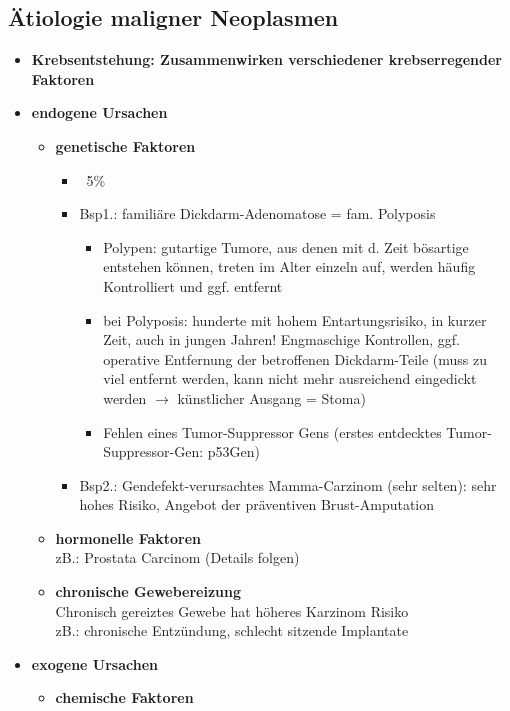 	\subsection{Ätiologie maligner Neoplasmen}
		\begin{itemize}
			\item \textbf{Krebsentstehung: Zusammenwirken verschiedener krebserregender Faktoren}
			\item \textbf{endogene Ursachen}
				\begin{itemize}
					\item \textbf{genetische Faktoren}
						\begin{itemize}
							\item ~5\% 
							\item Bsp1.: familiäre Dickdarm-Adenomatose = fam. Polyposis
								\begin{itemize}
									\item Polypen: gutartige Tumore, aus denen mit d. Zeit bösartige entstehen können, treten im Alter einzeln auf, werden häufig Kontrolliert und ggf. entfernt
									\item bei Polyposis: hunderte mit hohem Entartungsrisiko, in kurzer Zeit, auch in jungen Jahren! Engmaschige Kontrollen, ggf. operative Entfernung der betroffenen Dickdarm-Teile (muss zu viel entfernt werden, kann nicht mehr ausreichend eingedickt werden $\rightarrow$ künstlicher Ausgang = Stoma) 
									\item Fehlen eines Tumor-Suppressor Gens (erstes entdecktes Tumor-Suppressor-Gen: p53Gen)
								\end{itemize}
							\item Bsp2.: Gendefekt-verursachtes Mamma-Carzinom (sehr selten): sehr hohes Risiko, Angebot der präventiven Brust-Amputation
						\end{itemize}
					\item  \textbf{hormonelle Faktoren} \\
						zB.: Prostata Carcinom (Details folgen)						
					\item	\textbf{chronische Gewebereizung} \\
						Chronisch gereiztes Gewebe hat höheres Karzinom Risiko\\
						zB.: chronische Entzündung, schlecht sitzende Implantate 
				\end{itemize}
			\item \textbf{exogene Ursachen}
				\begin{itemize}
					\item \textbf{chemische Faktoren}

\end{itemize}
\end{itemize}
